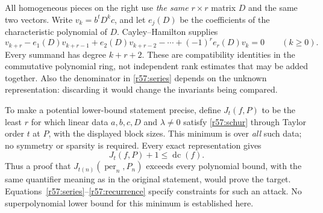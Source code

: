 \documentclass[11pt,a4paper]{article}
\numberwithin{equation}{section}
\begin{document}
All homogeneous pieces on the right use \emph{the same} $r\times r$ matrix $D$ and the same two vectors. Write $v_k=b^tD^kc$, and let $e_j(D)$ be the coefficients of the characteristic polynomial of $D$. Cayley--Hamilton supplies
\begin{equation}\label{r57:recurrence}
 v_{k+r}-e_1(D)v_{k+r-1}+e_2(D)v_{k+r-2}
          -\cdots+(-1)^re_r(D)v_k=0\qquad(k\geq0).
\end{equation}
Every summand has degree $k+r+2$. These are compatibility identities in the commutative polynomial ring, not independent rank estimates that may be added together. Also the denominator in \eqref{r57:series} depends on the unknown representation: discarding it would change the invariants being compared.

To make a potential lower-bound statement precise, define $J_t(f,P)$ to be the least $r$ for which linear data $a,b,c,D$ and $\lambda\ne0$ satisfy \eqref{r57:schur} through Taylor order $t$ at $P$, with the displayed block sizes. This minimum is over \emph{all} such data; no symmetry or sparsity is required. Every exact representation gives
\begin{equation}\label{r57:jetbound}
 J_t(f,P)+1\leq\operatorname{dc}(f).
\end{equation}
Thus a proof that $J_{t(n)}(\operatorname{per}_n,P_n)$ exceeds every polynomial bound, with the same quantifier meaning as in the original statement, would prove the target. Equations~\eqref{r57:series}--\eqref{r57:recurrence} specify constraints for such an attack. No superpolynomial lower bound for this minimum is established here.
\end{document}
